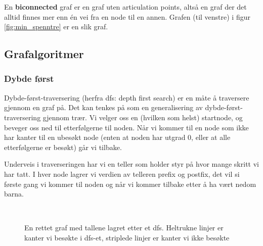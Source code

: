 En \textbf{biconnected} graf er en graf uten articulation points, altså en graf der det alltid finnes mer enn én vei fra en node til en annen. Grafen (til venstre) i figur \ref{fig:min_spenntre} er en slik graf. 

\subsection{Grafalgoritmer}

\subsubsection{Dybde først}
\label{dfs}
Dybde-først-traversering (herfra dfs: depth first search) er en måte å traversere gjennom en graf på. Det kan tenkes på som en generalisering av dybde-først-traversering gjennom trær. Vi velger oss en (hvilken som helst) startnode, og beveger oss ned til etterfølgerne til noden. Når vi kommer til en node som ikke har kanter til en ubesøkt node (enten at noden har utgrad 0, eller at alle etterfølgerne er besøkt) går vi tilbake. 

Underveis i traverseringen har vi en teller som holder styr på hvor mange skritt vi har tatt. I hver node lagrer vi verdien av telleren prefix og postfix, det vil si første gang vi kommer til noden og når vi kommer tilbake etter å ha vært nedom barna. 

\begin{figure}[H]
\centering
\captionsetup{justification=centering,margin=1cm}
\caption{En rettet graf med tallene lagret etter et dfs. Heltrukne linjer er kanter vi besøkte i dfs-et, striplede linjer er kanter vi ikke besøkte}~\\
\label{fig:dfs}
\end{figure}

